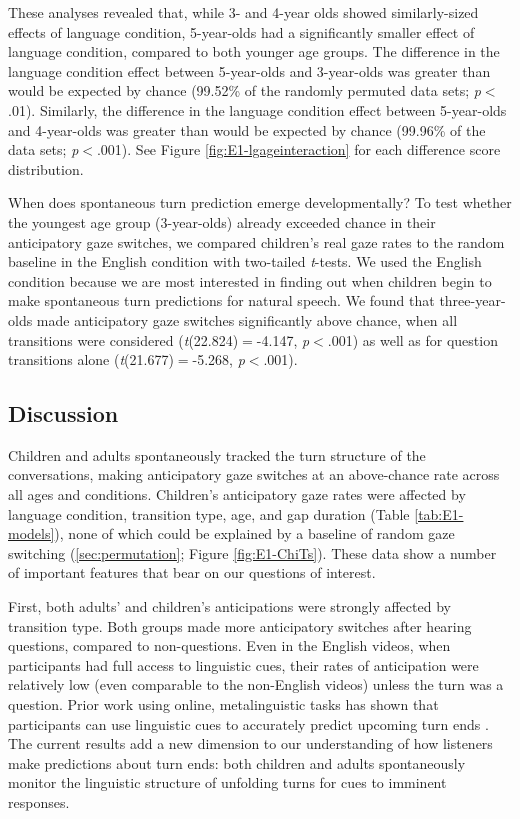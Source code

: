 \documentclass[authoryear, 12pt]{elsarticle}
\begin{document}
These analyses revealed that, while 3- and 4-year olds showed similarly-sized effects of language condition, 5-year-olds had a significantly smaller effect of language condition, compared to both younger age groups. The difference in the language condition effect between 5-year-olds and 3-year-olds was greater than would be expected by chance (99.52\% of the randomly permuted data sets; \textit{p}$<$.01). Similarly, the difference in the language condition effect between 5-year-olds and 4-year-olds was greater than would be expected by chance (99.96\% of the data sets; \textit{p}$<$.001). See Figure \ref{fig:E1-lgageinteraction} for each difference score distribution.

When does spontaneous turn prediction emerge developmentally? To test whether the youngest age group (3-year-olds) already exceeded chance in their anticipatory gaze switches, we compared children's real gaze rates to the random baseline in the English condition with two-tailed \textit{t}-tests. We used the English condition because we are most interested in finding out when children begin to make spontaneous turn predictions for natural speech. We found that three-year-olds made anticipatory gaze switches significantly above chance, when all transitions were considered (\textit{t}(22.824)$=$-4.147, \textit{p}$<$.001) as well as for question transitions alone (\textit{t}(21.677)$=$-5.268, \textit{p}$<$.001).

\subsection{Discussion}
\label{sec:discussion1}

Children and adults spontaneously tracked the turn structure of the conversations, making anticipatory gaze switches at an above-chance rate across all ages and conditions. Children's anticipatory gaze rates were affected by language condition, transition type, age, and gap duration (Table \ref{tab:E1-models}), none of which could be explained by a baseline of random gaze switching (\ref{sec:permutation}; Figure \ref{fig:E1-ChiTs}). These data show a number of important features that bear on our questions of interest. 

First, both adults' and children's anticipations were strongly affected by transition type. Both groups made more anticipatory switches after hearing questions, compared to non-questions. Even in the English videos, when participants had full access to linguistic cues, their rates of anticipation were relatively low (even comparable to the non-English videos) unless the turn was a question. Prior work using online, metalinguistic tasks has shown that participants can use linguistic cues to accurately predict upcoming turn ends \citep{torreira2015, magyari2012, de-ruiter2006}. The current results add a new dimension to our understanding of how listeners make predictions about turn ends: both children and adults spontaneously monitor the linguistic structure of unfolding turns for cues to imminent responses.
\end{document}
